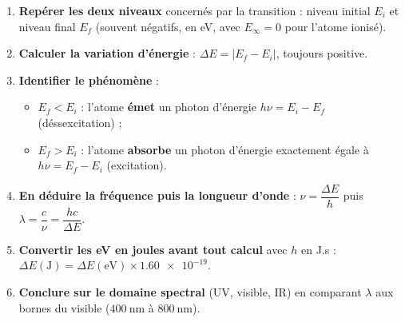 \documentclass[11pt]{article}
\begin{document}
\begin{methode}[Utiliser la relation $\Delta E = h\nu$ sur un diagramme d'énergie]
\begin{enumerate}
\item \textbf{Repérer les deux niveaux} concernés par la transition : niveau initial $E_i$ et niveau final $E_f$ (souvent négatifs, en eV, avec $E_\infty = 0$ pour l'atome ionisé).
\item \textbf{Calculer la variation d'énergie} : $\Delta E = |E_f - E_i|$, toujours positive.
\item \textbf{Identifier le phénomène} :
\begin{itemize}
\item $E_f < E_i$ : l'atome \textbf{émet} un photon d'énergie $h\nu = E_i - E_f$ (déssexcitation) ;
\item $E_f > E_i$ : l'atome \textbf{absorbe} un photon d'énergie exactement égale à $h\nu = E_f - E_i$ (excitation).
\end{itemize}
\item \textbf{En déduire la fréquence puis la longueur d'onde} : $\nu = \dfrac{\Delta E}{h}$ puis $\lambda = \dfrac{c}{\nu} = \dfrac{hc}{\Delta E}$.
\item \textbf{Convertir les eV en joules avant tout calcul} avec $h$ en J.s : $\Delta E(\text{J}) = \Delta E(\text{eV}) \times \num{1,60e-19}$.
\item \textbf{Conclure sur le domaine spectral} (UV, visible, IR) en comparant $\lambda$ aux bornes du visible ($400~\text{nm}$ à $800~\text{nm}$).
\end{enumerate}
\end{methode}
\end{document}
